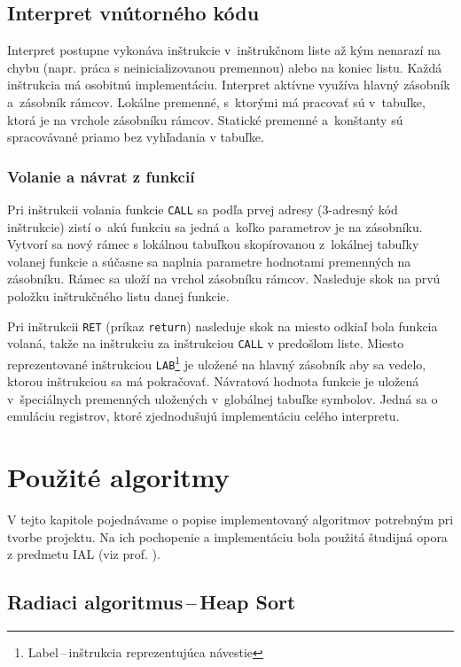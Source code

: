 \documentclass[11pt,a4paper]{article}
\begin{document}
	\subsection{Interpret vnútorného kódu}
	\label{interpret}
	Interpret postupne vykonáva inštrukcie v~inštrukčnom liste až kým nenarazí
	na chybu (napr. práca s neinicializovanou premennou) alebo na koniec listu.
	Každá inštrukcia má osobitnú implementáciu. Interpret aktívne využíva hlavný
	zásobník a~zásobník rámcov. Lokálne premenné, s~ktorými má pracovať  sú v~tabuľke,
	ktorá je na vrchole zásobníku rámcov. Statické premenné a~konštanty sú spracovávané
	priamo bez vyhľadania v tabuľke.

	\subsubsection{Volanie a návrat z funkcií}
	\label{funkcia}
	Pri inštrukcii volania funkcie \texttt{CALL} sa podľa prvej adresy
	(3-adresný kód inštrukcie) zistí o~akú funkciu sa jedná a~koľko parametrov
	je na zásobníku. Vytvorí sa nový rámec s lokálnou tabuľkou skopírovanou
	z~lokálnej tabuľky volanej funkcie a súčasne sa naplnia parametre
	hodnotami premenných na zásobníku. Rámec sa uloží na vrchol zásobníku rámcov.
	Nasleduje skok na prvú položku inštrukčného listu danej funkcie.


	Pri inštrukcii \texttt{RET} (príkaz \texttt{return}) nasleduje skok na
	miesto odkiaľ bola funkcia volaná, takže na inštrukciu za inštrukciou
	\texttt{CALL} v predošlom liste. Miesto reprezentované inštrukciou
	\texttt{LAB}\footnote{Label\,--\,inštrukcia reprezentujúca návestie}
	je uložené na hlavný zásobník aby sa vedelo, ktorou inštrukciou
	sa má pokračovať. Návratová hodnota funkcie je uložená v~špeciálnych
	premenných uložených v~globálnej tabuľke symbolov. Jedná sa o emuláciu
	registrov, ktoré zjednodušujú implementáciu celého interpretu.




	\section{Použité algoritmy}
	\label{algoritmy}

	V tejto kapitole pojednávame o popise implementovaný algoritmov potrebným pri tvorbe projektu. Na ich pochopenie a implementáciu bola použitá študijná opora z predmetu IAL (viz prof. \cite{opora}).

	\subsection{Radiaci algoritmus\,--\,Heap Sort}
\end{document}
